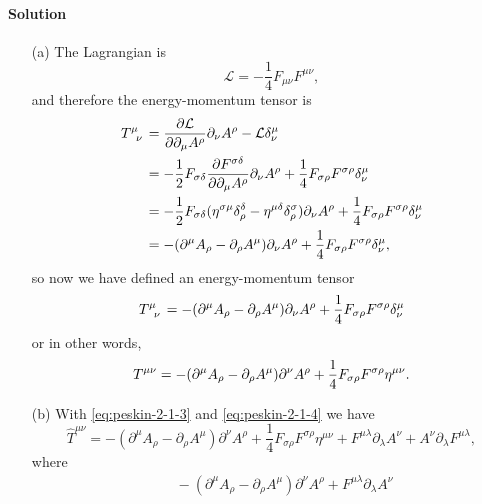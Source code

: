 \documentclass[hyperref, a4paper]{article}
\begin{document}
\paragraph{Solution} 
\begin{itemize}
    \item[(a)] The Lagrangian is 
    \begin{equation}
        \mathcal{L} = -\frac{1}{4} F_{\mu \nu} F^{\mu \nu},
    \end{equation} 
    and therefore the energy-momentum tensor is 
    \[
        \begin{aligned}
            T\indices{^\mu_\nu} &= \pdv{\mathcal{L}}{\partial_\mu A^\rho} \partial_\nu A^\rho - \mathcal{L} \delta^\mu_\nu \\
            &= - \frac{1}{2} F_{\sigma \delta} \pdv{F^{\sigma \delta}}{\partial_\mu A^\rho} \partial_\nu A^\rho + \frac{1}{4} F_{\sigma \rho} F^{\sigma \rho} \delta^\mu_\nu \\
            &= - \frac{1}{2} F_{\sigma \delta} (\eta^{\sigma \mu} \delta^\delta_\rho - \eta^{\mu \delta} \delta^\sigma_\rho) \partial_\nu A^\rho + \frac{1}{4} F_{\sigma \rho} F^{\sigma \rho} \delta^\mu_\nu  \\
            &= - (\partial^\mu A_\rho - \partial_\rho A^\mu) \partial_\nu A^\rho + \frac{1}{4} F_{\sigma \rho} F^{\sigma \rho} \delta^\mu_\nu,
        \end{aligned}
    \] 
    so now we have defined an energy-momentum tensor
    \begin{equation}
        T\indices{^\mu_\nu} = - (\partial^\mu A_\rho - \partial_\rho A^\mu) \partial_\nu A^\rho + \frac{1}{4} F_{\sigma \rho} F^{\sigma \rho} \delta^\mu_\nu
    \end{equation}
    or in other words,
    \begin{equation}
        T\indices{^\mu^\nu} = - (\partial^\mu A_\rho - \partial_\rho A^\mu) \partial^\nu A^\rho + \frac{1}{4} F_{\sigma \rho} F^{\sigma \rho} \eta^{\mu \nu}.
    \end{equation}
    \item[(b)] With \eqref{eq:peskin-2-1-3} and \eqref{eq:peskin-2-1-4} we have
    \[
        \hat{T}^{\mu \nu} = - (\partial^\mu A_\rho - \partial_\rho A^\mu) \partial^\nu A^\rho + \frac{1}{4} F_{\sigma \rho} F^{\sigma \rho} \eta^{\mu \nu} + F^{\mu \lambda} \partial_\lambda A^\nu + A^\nu \partial_\lambda F^{\mu \lambda},
    \] 
    where 
    \[
        \begin{aligned}
            &\quad - (\partial^\mu A_\rho - \partial_\rho A^\mu) \partial^\nu A^\rho + F^{\mu \lambda} \partial_\lambda A^\nu \\

\end{aligned}\]
\end{itemize}
\end{document}
